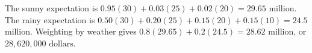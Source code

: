 The sunny expectation is $0.95(30)+0.03(25)+0.02(20)=29.65$ million. The rainy expectation is $0.50(30)+0.20(25)+0.15(20)+0.15(10)=24.5$ million. Weighting by weather gives $0.8(29.65)+0.2(24.5)=28.62$ million, or $\boxed{28,620,000\text{ dollars}}$.
